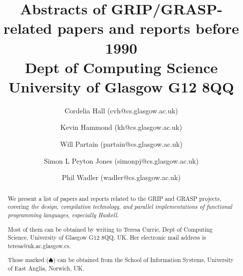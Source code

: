 
\newcommand{\reference}[4]{     %
\large
#1, {\em #2}, #3.
\normalsize
\begin{quotation}
#4
\end{quotation}
\vspace{0.2in}
}

\newcommand{\Haskell}[1]{{\sc Haskell}}



\title{Abstracts of GRIP/GRASP-related papers and reports before 1990\\
Dept of Computing Science \\
University of Glasgow G12 8QQ}

\author{
Cordelia Hall (cvh@cs.glasgow.ac.uk) \and
Kevin Hammond (kh@cs.glasgow.ac.uk) \and
Will Partain (partain@cs.glasgow.ac.uk) \and
Simon L Peyton Jones (simonpj@cs.glasgow.ac.uk) \and
Phil Wadler (wadler@cs.glasgow.ac.uk) 
}

\maketitle

\begin{abstract}
We present a list of papers and reports related to the GRIP 
and GRASP projects,
covering {\em the design, compilation technology,
and parallel implementations of functional programming languages, especially
\Haskell{}}.

Most of them can be obtained by writing to 
Teresa Currie, Dept of Computing Science,
University of Glasgow G12 8QQ, UK.   Her electronic mail address is
teresa@uk.ac.glasgow.cs.

Those marked ($\spadesuit$) can be obtained from the School of Information
Systems, University of East Anglia, Norwich, UK.
\end{abstract}

